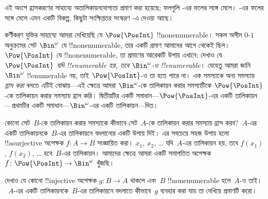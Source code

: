\documentclass[../../../include/open-logic-section]{subfiles}
\begin{document}


\begin{editorial}
  এই অংশে হ্রাসকরণের সাহায্যে অতালিকায়নযোগ্যতা প্রমাণ করা হয়েছে; ফলগুলি -এর ফলের সঙ্গে মেলে। -এর ফলের সঙ্গে মেলে এমন একটি বিকল্প, কিছুটা সংক্ষিপ্ততর সংস্করণ -এ দেওয়া আছে।
\end{editorial}

কর্ণীকরণ যুক্তির সাহায্যে আমরা দেখিয়েছি যে $\Pow{\PosInt}$ !!{nonenumerable}। সকল অসীম $0$-$1$ অনুক্রমের সেট $\Bin^\omega$ যে !!{nonenumerable}, তার একটি প্রমাণ আমাদের আগে থেকেই ছিল। $\Pow{\PosInt}$ যে !!{nonenumerable}, তা প্রমাণের আরেকটি উপায় এখানে: দেখাও যে \emph{$\Pow{\PosInt}$ যদি !!{enumerable} হয়, তবে $\Bin^\omega$-ও !!{enumerable}}। যেহেতু আমরা জানি $\Bin^\omega$ !!{enumerable} নয়, তাই $\Pow{\PosInt}$-ও তা হতে পারে না। এক সমস্যাকে অন্য সমস্যায় \emph{হ্রাস করা} বলতে এটিই বোঝায়—এই ক্ষেত্রে আমরা $\Bin^\omega$-কে তালিকায়ন করার সমস্যাটিকে $\Pow{\PosInt}$-কে তালিকায়ন করার সমস্যায় হ্রাস করি। দ্বিতীয়টির একটি সমাধান—$\Pow{\PosInt}$-এর একটি তালিকায়ন—প্রথমটির একটি সমাধান—$\Bin^\omega$-এর একটি তালিকায়ন—দিত।

কোনো সেট~$B$-কে তালিকায়ন করার সমস্যাকে কীভাবে সেট~$A$-কে তালিকায়ন করার সমস্যায় হ্রাস করব?~$A$-এর একটি তালিকায়নকে~$B$-এর তালিকায়নে বদলানোর একটি উপায় দিই। এর সবচেয়ে সহজ উপায় হলো !!a{surjective} অপেক্ষক $f\colon A \to B$ সংজ্ঞায়িত করা। $x_1$, $x_2$, \dots{} যদি~$A$-এর তালিকায়ন হয়, তবে $f(x_1)$, $f(x_2)$, \dots{} হবে~$B$-এর তালিকায়ন। আমাদের ক্ষেত্রে আমরা একটি সমাপতিত অপেক্ষক $f\colon \Pow{\PosInt} \to \Bin^\omega$ খুঁজছি।

\begin{prob}
দেখাও যে কোনো !!{injective} অপেক্ষক $g\colon B \to A$ থাকলে এবং~$B$ !!{nonenumerable} হলে~$A$-ও তাই।~$A$-এর একটি তালিকায়নকে~$B$-এর তালিকায়নে বদলাতে কীভাবে~$g$ ব্যবহার করা যায় তা দেখিয়ে প্রমাণটি করো।
\end{prob}
\end{document}
